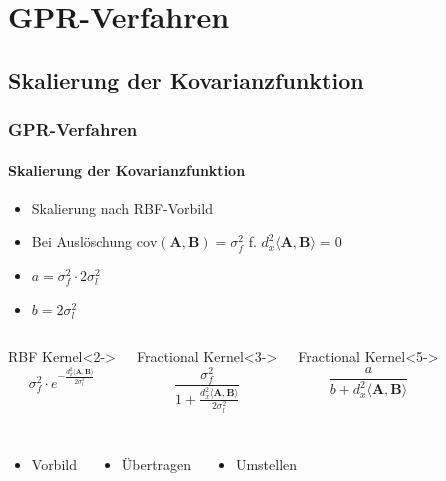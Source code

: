 \documentclass{beamer}
\begin{document}
\section{GPR-Verfahren}
\subsection{Skalierung der Kovarianzfunktion}
\begin{frame}
\frametitle{GPR-Verfahren}
\framesubtitle{Skalierung der Kovarianzfunktion}
\begin{itemize}
	\item<1-> Skalierung nach RBF-Vorbild
	\item<4-> Bei Auslöschung $\text{cov}(\mathbf{A},\mathbf{B})=\sigma_f^2$ f. $d_x^2\langle\mathbf{A},\mathbf{B}\rangle = 0$
	\item<6-> $a=\sigma_f^2 \cdot 2\sigma_l^2$
	\item<6-> $b=2\sigma_l^2$
\end{itemize}
\begin{columns}[c]
	\begin{block}{RBF Kernel}<2->
		\begin{equation*}\sigma_f^2 \cdot e^{-\frac{d_x^2\langle\mathbf{A},\mathbf{B}\rangle}{2\sigma_l^2}}\end{equation*}
	\end{block}
	
	
	\begin{block}{Fractional Kernel}<3->
		\begin{equation*}{\frac{\sigma_f^2}{1 + \frac{d_x^2\langle\mathbf{A},\mathbf{B}\rangle}{2\sigma_l^2}}}\end{equation*}
	\end{block}

	
	\begin{block}{Fractional Kernel}<5->
		\begin{equation*}\frac{a}{b + d_x^2\langle\mathbf{A},\mathbf{B}\rangle}\end{equation*}
	\end{block}
\end{columns}
\begin{columns}[c]
	\begin{itemize}
		\item<2-> Vorbild
	\end{itemize}
	
	\begin{itemize}
		\item<4-> Übertragen
	\end{itemize}
	
	\begin{itemize}
		\item<6-> Umstellen
	\end{itemize}
\end{columns}
\end{frame}
\end{document}
